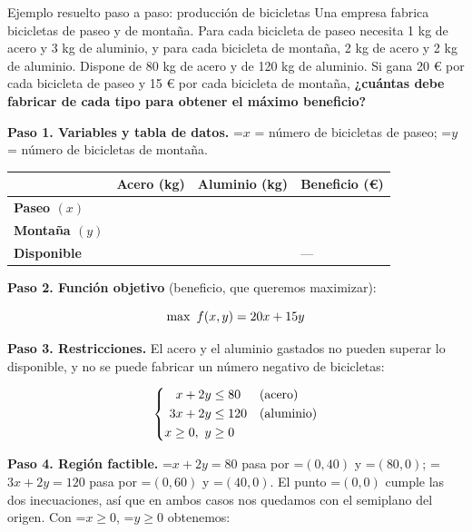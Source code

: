 \documentclass[11pt,a4paper]{article}
\newcommand{\fmm}[1]{\setbox0=\hbox{$#1$}\ifdim\wd0>\linewidth\fmdisp{#1}\else\mbox{\box0}\fi}
\newcommand{\fmdisp}[1]{\[\setbox2=\hbox{$\displaystyle #1$}\ifdim\wd2>\linewidth\resizebox{\linewidth}{!}{\box2}\else\box2\fi\]}
\begin{document}
\begin{fmex}{Ejemplo resuelto paso a paso: producción de bicicletas}
Una empresa fabrica bicicletas de paseo y de montaña. Para cada bicicleta de paseo necesita 1 kg de acero y 3 kg de aluminio, y para cada bicicleta de montaña, 2 kg de acero y 2 kg de aluminio. Dispone de 80 kg de acero y de 120 kg de aluminio. Si gana 20 € por cada bicicleta de paseo y 15 € por cada bicicleta de montaña, \textbf{¿cuántas debe fabricar de cada tipo para obtener el máximo beneficio?}

\textbf{Paso 1. Variables y tabla de datos.} \fmm{x} = número de bicicletas de paseo; \fmm{y} = número de bicicletas de montaña.

\begin{center}\renewcommand{\arraystretch}{1.5}\small\begin{tabularx}{\linewidth}{>{\raggedright\arraybackslash}p{3.2cm}>{\raggedright\arraybackslash}X>{\raggedright\arraybackslash}X>{\raggedright\arraybackslash}X}\toprule
\textbf{} & \textbf{Acero (kg)} & \textbf{Aluminio (kg)} & \textbf{Beneficio (€)}\\\midrule
\textbf{Paseo $(x)$} & 1 & 3 & 20\\[3pt]
\textbf{Montaña $(y)$} & 2 & 2 & 15\\[3pt]
\textbf{Disponible} & 80 & 120 & —\\[3pt]
\bottomrule\end{tabularx}\end{center}

\textbf{Paso 2. Función objetivo} (beneficio, que queremos maximizar):

\fmdisp{\max\ f(x,y)=20x+15y}

\textbf{Paso 3. Restricciones.} El acero y el aluminio gastados no pueden superar lo disponible, y no se puede fabricar un número negativo de bicicletas:

\fmdisp{\left\{\begin{aligned}x+2y&\leq80 &&\text{(acero)}\\ 3x+2y&\leq120 &&\text{(aluminio)}\\ x\geq0,\ y&\geq0\end{aligned}\right.}

\textbf{Paso 4. Región factible.} \fmm{x+2y=80} pasa por \fmm{(0,40)} y \fmm{(80,0)}; \fmm{3x+2y=120} pasa por \fmm{(0,60)} y \fmm{(40,0)}. El punto \fmm{(0,0)} cumple las dos inecuaciones, así que en ambos casos nos quedamos con el semiplano del origen. Con \fmm{x\geq0}, \fmm{y\geq0} obtenemos:


\end{fmex}
\end{document}
